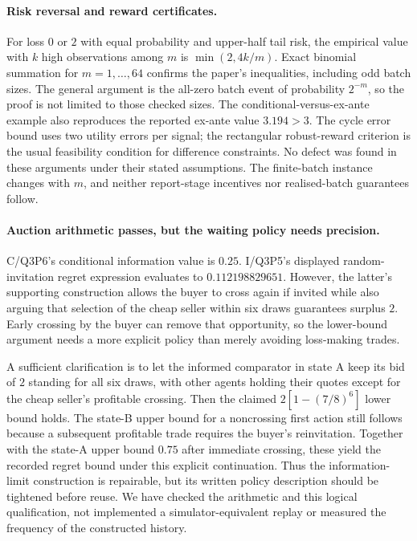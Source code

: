 \documentclass[11pt,a4paper]{article}
\begin{document}
\paragraph{Risk reversal and reward certificates.}
For loss $0$ or $2$ with equal probability and upper-half tail risk, the
empirical value with $k$ high observations among $m$ is
$\min(2,4k/m)$. Exact binomial summation for $m=1,\ldots,64$ confirms the
paper's inequalities, including odd batch sizes. The general argument is
the all-zero batch event of probability $2^{-m}$, so the proof is not
limited to those checked sizes. The conditional-versus-ex-ante example
also reproduces the reported ex-ante value $3.194>3$.
The cycle error bound uses two utility errors per signal; the rectangular
robust-reward criterion is the usual feasibility condition for difference
constraints. No defect was found in these arguments under their stated
assumptions. The finite-batch instance changes with $m$, and neither
report-stage incentives nor realised-batch guarantees follow.

\paragraph{Auction arithmetic passes, but the waiting policy needs precision.}
C/Q3P6's conditional information value is $0.25$. I/Q3P5's displayed
random-invitation regret expression evaluates to $0.112198829651$.
However, the latter's supporting construction allows the buyer to cross
again if invited while also arguing that selection of the cheap seller
within six draws guarantees surplus $2$. Early crossing by the buyer can
remove that opportunity, so the lower-bound argument needs a more explicit
policy than merely avoiding loss-making trades.

A sufficient clarification is to let the informed comparator in state A
keep its bid of $2$ standing for all six draws, with other agents holding
their quotes except for the cheap seller's profitable crossing. Then the
claimed $2[1-(7/8)^6]$ lower bound holds. The state-B upper bound for a
noncrossing first action still follows because a subsequent profitable
trade requires the buyer's reinvitation. Together with the state-A upper
bound $0.75$ after immediate crossing, these yield the recorded regret
bound under this explicit continuation. Thus the information-limit
construction is repairable, but its written policy description should be
tightened before reuse. We have checked the arithmetic and this logical
qualification, not implemented a simulator-equivalent replay or measured
the frequency of the constructed history.
\end{document}
